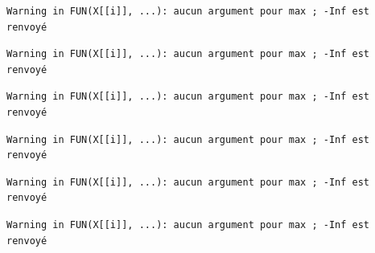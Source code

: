 \documentclass[]{article}
\begin{document}
\begin{verbatim}
Warning in FUN(X[[i]], ...): aucun argument pour max ; -Inf est renvoyé
\end{verbatim}

\begin{verbatim}
Warning in FUN(X[[i]], ...): aucun argument pour max ; -Inf est renvoyé
\end{verbatim}

\begin{verbatim}
Warning in FUN(X[[i]], ...): aucun argument pour max ; -Inf est renvoyé
\end{verbatim}

\begin{verbatim}
Warning in FUN(X[[i]], ...): aucun argument pour max ; -Inf est renvoyé
\end{verbatim}

\begin{verbatim}
Warning in FUN(X[[i]], ...): aucun argument pour max ; -Inf est renvoyé
\end{verbatim}

\begin{verbatim}
Warning in FUN(X[[i]], ...): aucun argument pour max ; -Inf est renvoyé
\end{verbatim}
\end{document}
